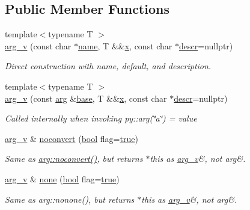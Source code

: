 \subsection*{Public Member Functions}
\begin{DoxyCompactItemize}
\item 
{\footnotesize template$<$typename T $>$ }\\\mbox{\hyperlink{structarg__v_a7d90c329733699b99eccbb55797d65fb}{arg\+\_\+v}} (const char $\ast$\mbox{\hyperlink{structname}{name}}, T \&\&\mbox{\hyperlink{_s_d_l__opengl_8h_ad0e63d0edcdbd3d79554076bf309fd47}{x}}, const char $\ast$\mbox{\hyperlink{structdescr}{descr}}=nullptr)
\begin{DoxyCompactList}\small\item\em Direct construction with name, default, and description. \end{DoxyCompactList}\item 
{\footnotesize template$<$typename T $>$ }\\\mbox{\hyperlink{structarg__v_a0a3a669c2b644bf122c3363d88c5dea6}{arg\+\_\+v}} (const \mbox{\hyperlink{structarg}{arg}} \&\mbox{\hyperlink{structbase}{base}}, T \&\&\mbox{\hyperlink{_s_d_l__opengl_8h_ad0e63d0edcdbd3d79554076bf309fd47}{x}}, const char $\ast$\mbox{\hyperlink{structdescr}{descr}}=nullptr)
\begin{DoxyCompactList}\small\item\em Called internally when invoking {\ttfamily py\+::arg(\char`\"{}a\char`\"{}) = value} \end{DoxyCompactList}\item 
\mbox{\hyperlink{structarg__v}{arg\+\_\+v}} \& \mbox{\hyperlink{structarg__v_a018e928b16cc3e83065740a92a490d07}{noconvert}} (\mbox{\hyperlink{asdl_8h_af6a258d8f3ee5206d682d799316314b1}{bool}} flag=\mbox{\hyperlink{asdl_8h_af6a258d8f3ee5206d682d799316314b1a08f175a5505a10b9ed657defeb050e4b}{true}})
\begin{DoxyCompactList}\small\item\em Same as {\ttfamily \mbox{\hyperlink{structarg_affdcf2c99a2f27cb539efd6853335d4b}{arg\+::noconvert()}}}, but returns $\ast$this as \mbox{\hyperlink{structarg__v}{arg\+\_\+v}}\&, not arg\&. \end{DoxyCompactList}\item 
\mbox{\hyperlink{structarg__v}{arg\+\_\+v}} \& \mbox{\hyperlink{structarg__v_a3d487f117dc8f3af6555519ab160716a}{none}} (\mbox{\hyperlink{asdl_8h_af6a258d8f3ee5206d682d799316314b1}{bool}} flag=\mbox{\hyperlink{asdl_8h_af6a258d8f3ee5206d682d799316314b1a08f175a5505a10b9ed657defeb050e4b}{true}})
\begin{DoxyCompactList}\small\item\em Same as {\ttfamily arg\+::nonone()}, but returns $\ast$this as \mbox{\hyperlink{structarg__v}{arg\+\_\+v}}\&, not arg\&. \end{DoxyCompactList}\end{DoxyCompactItemize}
